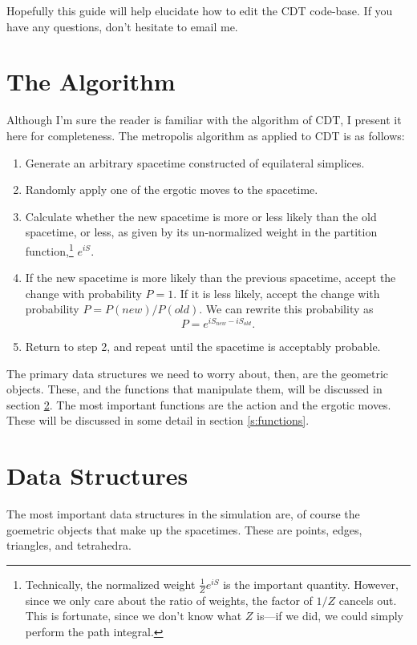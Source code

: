 \documentclass[12pt]{article}
\begin{document}
Hopefully this guide will help elucidate how to edit the CDT
code-base. If you have any questions, don't hesitate to email me.

\section{The Algorithm}
\label{s:algorithm}
Although I'm sure the reader is familiar with the algorithm of CDT, I
present it here for completeness. The metropolis algorithm as applied
to CDT is as follows:
\begin{enumerate}
\item Generate an arbitrary spacetime constructed of equilateral simplices.
\item Randomly apply one of the ergotic moves to the spacetime.
\item Calculate whether the new spacetime is more or less likely than
  the old spacetime, or less, as given by its un-normalized weight in
  the partition function,\footnote{Technically, the normalized weight
    $\frac{1}{Z}e^{iS}$ is the important quantity. However, since we
    only care about the ratio of weights, the factor of $1/Z$ cancels
    out. This is fortunate, since we don't know what $Z$ is---if we
    did, we could simply perform the path integral.} $e^{i S}$.
\item If the new spacetime is more likely than the previous spacetime,
  accept the change with probability $P=1$. If it is less likely,
  accept the change with probability $P = P(new)/P(old)$. We can
  rewrite this probability as
  $$P = e^{i S_{new} - i S_{old}}.$$
\item Return to step 2, and repeat until the spacetime is acceptably
  probable.
\end{enumerate}
The primary data structures we need to worry about, then, are the
geometric objects. These, and the functions that manipulate them, will
be discussed in section \ref{s:data-structures}. The most important
functions are the action and the ergotic moves. These will be
discussed in some detail in section \ref{s:functions}.

\section{Data Structures}
\label{s:data-structures}

The most important data structures in the simulation are, of course
the goemetric objects that make up the spacetimes. These are points,
edges, triangles, and tetrahedra. 
\end{document}
